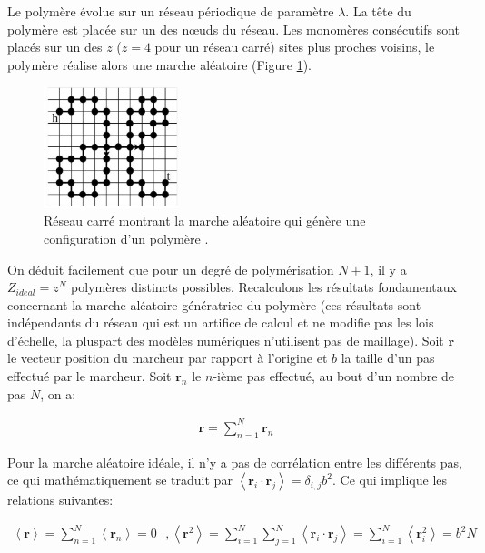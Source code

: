 \documentclass[a4paper,11pt]{article}
\begin{document}
Le polymère évolue sur un réseau périodique de paramètre $\lambda$. La tête du polymère est placée sur un des nœuds du réseau. Les monomères consécutifs sont placés sur un des $z$ ($z=4$ pour un réseau carré) sites plus proches voisins, le polymère réalise alors une marche aléatoire (Figure \ref{resideal}).

\begin{figure}[H]
\begin{center}
\includegraphics[width=0.35\textwidth]{resideal.jpg}

\caption{Réseau carré montrant la marche aléatoire qui génère une configuration d'un polymère \cite{these}.}
\label{resideal}
\end{center}
\end{figure}

On déduit facilement que pour un degré de polymérisation $N+1$, il y a $Z_{ideal}=z^N$ polymères distincts possibles. Recalculons les résultats fondamentaux concernant la marche aléatoire génératrice du polymère (ces résultats sont indépendants du réseau qui est un artifice de calcul et ne modifie pas les lois d'échelle, la pluspart des modèles numériques n'utilisent pas de maillage). Soit $\textbf{r}$ le vecteur position du marcheur par rapport à l'origine et $b$ la taille d'un pas effectué par le marcheur. Soit $\textbf{r}_n$ le $n$-ième pas effectué, au bout d'un nombre de pas $N$, on a: 

\begin{eqnarray}
\textbf{r} = \sum_{n = 1}^{N} \textbf{r}_n
\end{eqnarray}

Pour la marche aléatoire idéale, il n'y a pas de corrélation entre les différents pas, ce qui mathématiquement se traduit par $\left<\textbf{r}_i \cdot \textbf{r}_j\right> = \delta_{i,j} b^2$. Ce qui implique les relations suivantes:

\begin{eqnarray}
\left<\textbf{r}\right>\text{} = \sum_{n = 1}^{N} \left<\textbf{r}_n \right>\text{} =\text{} 0 \text{ }, \text{} \left<\textbf{r}^2\right> \text{}= \sum_{i = 1}^{N} \sum_{j = 1}^{N} \left<\textbf{r}_i \cdot \textbf{r}_j\right> \text{}= \sum_{i = 1}^{N} \left<\textbf{r}_i^2\right> \text{}= b^2 N
\label{rdmwalk}
\end{eqnarray}
\end{document}
